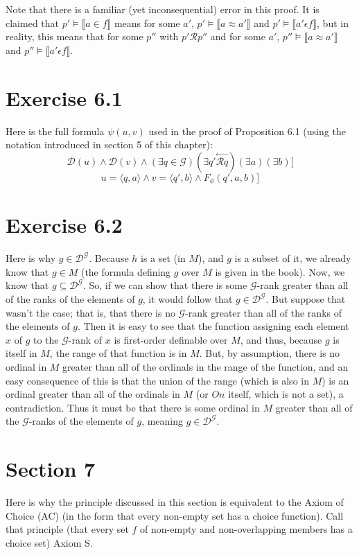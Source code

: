 \documentclass{article}
\newcommand{\lbc}{\llbracket}
\newcommand{\rbc}{\rrbracket}
\newcommand{\ltop}[1]{\stackrel{\leftarrow}{#1}}
\theoremstyle{definition}
\begin{document}
Note that there is a familiar (yet inconsequential) error in this proof. It is claimed that 
$p'\vDash\lbc a\in f\rbc$ means for some $a'$, $p'\vDash\lbc a\approx a'\rbc$ and $p'\vDash\lbc a'\epsilon f\rbc$, but in reality, 
this means that for some $p''$ with $p'\mathcal{R}p''$ and for some $a'$, 
$p''\vDash\lbc a\approx a'\rbc$ and $p''\vDash\lbc a'\epsilon f\rbc$.

\section*{Exercise 6.1}
Here is the full formula $\psi(u,v)$ used in the proof of Proposition 6.1 (using the notation introduced in section 5 of this chapter):
\[ \mathcal{D}(u)\wedge\mathcal{D}(v)\wedge(\exists q\in\mathcal{G})(\exists q'\ltop{\mathcal{R}q})(\exists a)(\exists b)[ \]
\[ u=\langle q,a\rangle\wedge v=\langle q',b\rangle\wedge F_\phi(q',a,b)] \]

\section*{Exercise 6.2}
Here is why $g\in\mathcal{D}^\mathcal{G}$. Because $h$ is a set (in $M$), and $g$ is a subset of it, we already know that 
$g\in M$ (the formula defining $g$ over $M$ is given in the book). Now, we know that $g\subseteq\mathcal{D}^\mathcal{G}$. 
So, if we can show that there is some $\mathcal{G}$-rank greater than all of the ranks of the elements of $g$, it would follow 
that $g\in\mathcal{D}^\mathcal{G}$. But suppose that wasn't the case; that is, that there is no $\mathcal{G}$-rank greater than 
all of the ranks of the elements of $g$. Then it is easy to see that the function assigning each 
element $x$ of $g$ to the $\mathcal{G}$-rank of $x$ is first-order definable over $M$, and thus, because $g$ is itself 
in $M$, the range of that function is in $M$. But, by assumption, there is no ordinal in $M$ greater than all of the 
ordinals in the range of the function, and an easy consequence of this is that the union of the range (which is also in $M$) 
is an ordinal greater than all of the ordinals in $M$ (or $On$ itself, which is not a set), a contradiction. 
Thus it must be that there is some ordinal 
in $M$ greater than all of the $\mathcal{G}$-ranks of the elements of $g$, meaning $g\in\mathcal{D}^\mathcal{G}$.

\section*{Section 7}
Here is why the principle discussed in this section is equivalent to the Axiom of Choice (AC) (in the form that 
every non-empty set has a choice function). Call that principle
(that every set $f$ of non-empty and non-overlapping members has a choice set) Axiom S.
\end{document}
